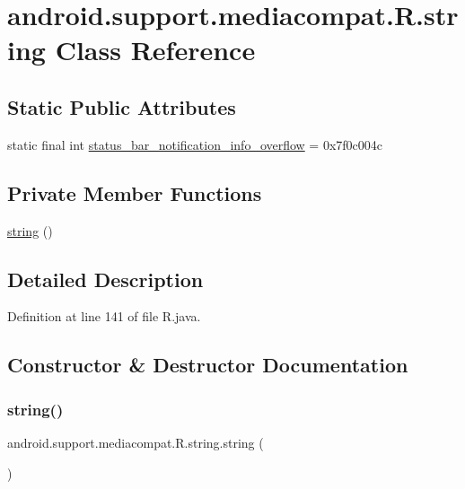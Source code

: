 \hypertarget{classandroid_1_1support_1_1mediacompat_1_1_r_1_1string}{}\section{android.\+support.\+mediacompat.\+R.\+string Class Reference}
\label{classandroid_1_1support_1_1mediacompat_1_1_r_1_1string}
\subsection*{Static Public Attributes}
\begin{DoxyCompactItemize}
\item 
static final int \mbox{\hyperlink{classandroid_1_1support_1_1mediacompat_1_1_r_1_1string_a61a68d0b52b88ec2a9d2824d55d92090}{status\+\_\+bar\+\_\+notification\+\_\+info\+\_\+overflow}} = 0x7f0c004c
\end{DoxyCompactItemize}
\subsection*{Private Member Functions}
\begin{DoxyCompactItemize}
\item 
\mbox{\hyperlink{classandroid_1_1support_1_1mediacompat_1_1_r_1_1string_a4ab7f84ef3d7319b55512cd51e42d4d4}{string}} ()
\end{DoxyCompactItemize}


\subsection{Detailed Description}


Definition at line 141 of file R.\+java.



\subsection{Constructor \& Destructor Documentation}
\mbox{\label{classandroid_1_1support_1_1mediacompat_1_1_r_1_1string_a4ab7f84ef3d7319b55512cd51e42d4d4}} 
\subsubsection{\texorpdfstring{string()}{string()}}
{\footnotesize\ttfamily android.\+support.\+mediacompat.\+R.\+string.\+string (\begin{DoxyParamCaption}{ }\end{DoxyParamCaption})\hspace{0.3cm}{\ttfamily [private]}}



